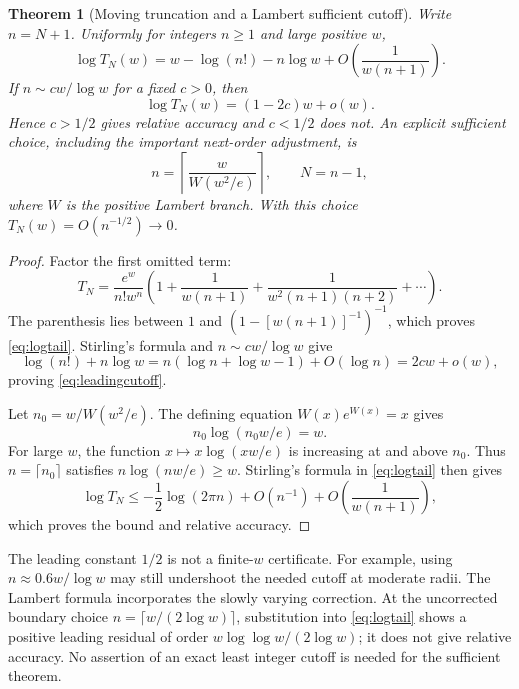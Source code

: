 \documentclass[11pt,a4paper]{article}
\newtheorem{theorem}{Theorem}[section]
\theoremstyle{definition}
\theoremstyle{remark}
\numberwithin{equation}{section}
\begin{document}
\begin{theorem}[Moving truncation and a Lambert sufficient cutoff]\label{thm:lambertcutoff}
Write $n=N+1$. Uniformly for integers $n\ge1$ and large positive $w$,
\begin{equation}\label{eq:logtail}
 \log T_N(w)=w-\log(n!)-n\log w
 +O\left(\frac1{w(n+1)}\right).
\end{equation}
If $n\sim c w/\log w$ for a fixed $c>0$, then
\begin{equation}\label{eq:leadingcutoff}
 \log T_N(w)=(1-2c)w+o(w).
\end{equation}
Hence $c>1/2$ gives relative accuracy and $c<1/2$ does not. An explicit sufficient choice, including the important next-order adjustment, is
\begin{equation}\label{eq:lambertcutoff}
 n=\left\lceil\frac{w}{W(w^2/e)}\right\rceil,
 \qquad N=n-1,
\end{equation}
where $W$ is the positive Lambert branch. With this choice $T_N(w)=O(n^{-1/2})\to0$.
\end{theorem}
\begin{proof}
Factor the first omitted term:
\[
 T_N=\frac{e^w}{n!w^n}
 \left(1+\frac1{w(n+1)}+
 \frac1{w^2(n+1)(n+2)}+\cdots\right).
\]
The parenthesis lies between $1$ and $(1-[w(n+1)]^{-1})^{-1}$, which proves \eqref{eq:logtail}. Stirling's formula and $n\sim c w/\log w$ give
\[
 \log(n!)+n\log w
 =n(\log n+\log w-1)+O(\log n)=2cw+o(w),
\]
proving \eqref{eq:leadingcutoff}.

Let $n_0=w/W(w^2/e)$. The defining equation $W(x)e^{W(x)}=x$ gives
\[
 n_0\log(n_0w/e)=w.
\]
For large $w$, the function $x\mapsto x\log(xw/e)$ is increasing at and above $n_0$. Thus $n=\lceil n_0\rceil$ satisfies $n\log(nw/e)\ge w$. Stirling's formula in \eqref{eq:logtail} then gives
\[
 \log T_N\le-\frac12\log(2\pi n)+O(n^{-1})
 +O\left(\frac1{w(n+1)}\right),
\]
which proves the bound and relative accuracy.
\end{proof}

The leading constant $1/2$ is not a finite-$w$ certificate. For example, using $n\approx0.6w/\log w$ may still undershoot the needed cutoff at moderate radii. The Lambert formula incorporates the slowly varying correction. At the uncorrected boundary choice $n=\lceil w/(2\log w)\rceil$, substitution into \eqref{eq:logtail} shows a positive leading residual of order $w\log\log w/(2\log w)$; it does not give relative accuracy. No assertion of an exact least integer cutoff is needed for the sufficient theorem.
\end{document}
